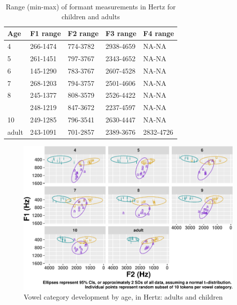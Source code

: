 \documentclass[
]{article}
\begin{document}
\begin{table}[!h]

\caption{\label{tab:formant-range-table}Range (min-max) of formant measurements in Hertz for children and adults}
\centering
\begin{tabular}[t]{lllll}
\toprule
Age & F1 range & F2 range & F3 range & F4 range\\
\midrule
4 & 266-1474 & 774-3782 & 2938-4659 & NA-NA\\
5 & 261-1451 & 797-3767 & 2343-4652 & NA-NA\\
6 & 145-1290 & 783-3767 & 2607-4528 & NA-NA\\
7 & 268-1203 & 794-3757 & 2501-4606 & NA-NA\\
8 & 245-1377 & 808-3579 & 2526-4422 & NA-NA\\
\addlinespace
9 & 248-1219 & 847-3672 & 2237-4597 & NA-NA\\
10 & 249-1285 & 796-3541 & 2630-4447 & NA-NA\\
adult & 243-1091 & 701-2857 & 2389-3676 & 2832-4726\\
\bottomrule
\end{tabular}
\end{table}

\begin{figure}
\centering
\includegraphics{3_vtl_results_files/figure-latex/hz-rawdata-plot-1.pdf}
\caption{\label{fig:hz-rawdata-plot}Vowel category development by age, in Hertz: adults and children}
\end{figure}
\end{document}
